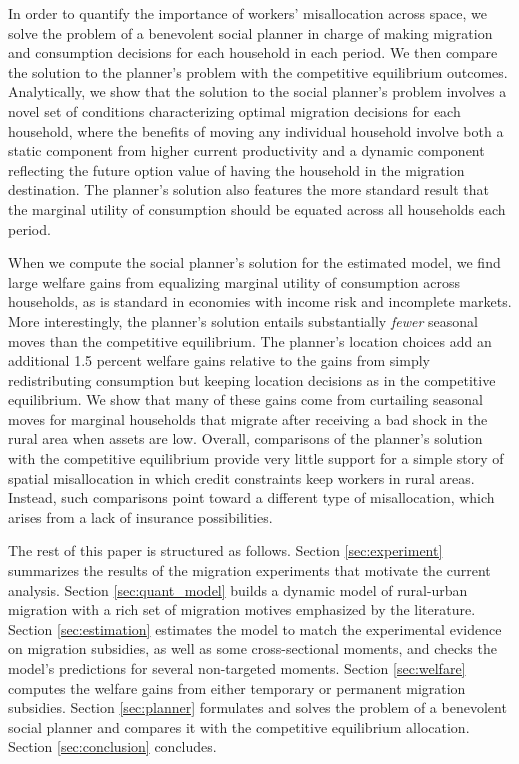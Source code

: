 \documentclass[12pt,pdftex]{article}
\begin{document}
In order to quantify the importance of workers' misallocation across space, we solve the problem of a benevolent social planner in charge of making migration and consumption decisions for each household in each period. We then compare the solution to the planner's problem with the competitive equilibrium outcomes. Analytically, we show that the solution to the social planner's problem involves a novel set of conditions characterizing optimal migration decisions for each household, where the benefits of moving any individual household involve both a static component from higher current productivity and a dynamic component reflecting the future option value of having the household in the migration destination. The planner's solution also features the more standard result that the marginal utility of consumption should be equated across all households each period.

When we compute the social planner's solution for the estimated model, we find large welfare gains from equalizing marginal utility of consumption across households, as is standard in economies with income risk and incomplete markets. More interestingly, the planner's solution entails substantially \emph{fewer} seasonal moves than the competitive equilibrium. The planner's location choices add an additional 1.5 percent welfare gains relative to the gains from simply redistributing consumption but keeping location decisions as in the competitive equilibrium. We show that many of these gains come from curtailing seasonal moves for marginal households that migrate after receiving a bad shock in the rural area when assets are low. Overall, comparisons of the planner's solution with the competitive equilibrium provide very little support for a simple story of spatial misallocation in which credit constraints keep workers in rural areas. Instead, such comparisons point toward a different type of misallocation, which arises from a lack of insurance possibilities.

The rest of this paper is structured as follows. Section \ref{sec:experiment} summarizes the results of the migration experiments that motivate the current analysis. Section \ref{sec:quant_model} builds a dynamic model of rural-urban migration with a rich set of migration motives emphasized by the literature. Section \ref{sec:estimation} estimates the model to match the experimental evidence on migration subsidies, as well as some cross-sectional moments, and checks the model's predictions for several non-targeted moments. Section \ref{sec:welfare} computes the welfare gains from either temporary or permanent migration subsidies. Section \ref{sec:planner} formulates and solves the problem of a benevolent social planner and compares it with the competitive equilibrium allocation. Section \ref{sec:conclusion} concludes.
\end{document}
